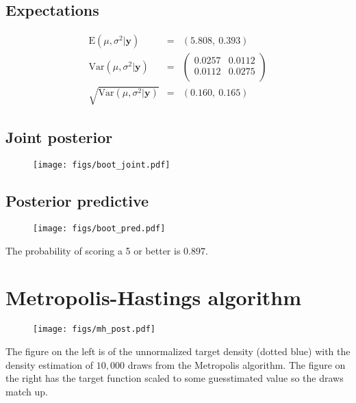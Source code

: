 \documentclass[12pt]{article}
\newcommand{\m}[1]{\mathbf{\bm{#1}}}
\begin{document}
\subsection{Expectations}

\begin{eqnarray*}
\mathrm{E}(\mu,\sigma^2|\m{y}) &=& (5.808,~0.393) \\
\mathrm{Var}(\mu, \sigma^2|\m{y}) &=& \left(\begin{array}{ll} 0.0257 & 0.0112 \\ 0.0112 & 0.0275 \\ \end{array}\right) \\
\sqrt{\mathrm{Var}(\mu, \sigma^2|\m{y})} &=& (0.160,~0.165)
\end{eqnarray*}

\subsection{Joint posterior}

\begin{figure}[H]
    \centering
    \texttt{[image: figs/boot\_joint.pdf]}
    \caption*{}
\end{figure}


\subsection{Posterior predictive}

\begin{figure}[H]
    \centering
    \texttt{[image: figs/boot\_pred.pdf]}
    \caption*{}
\end{figure}

\noindent The probability of scoring a 5 or better is $0.897$.

\section{Metropolis-Hastings algorithm}

\begin{figure}[H]
    \centering
    \texttt{[image: figs/mh\_post.pdf]}
    \caption*{}
\end{figure}

\noindent The figure on the left is of the unnormalized target density (dotted blue) with the density estimation of $10,000$ draws from the Metropolis algorithm. The figure on the right has the target function scaled to some guesstimated value so the draws match up.
\bigskip
\end{document}
